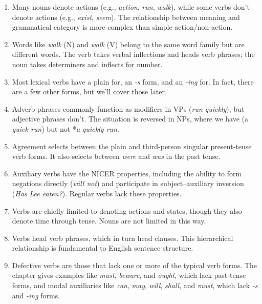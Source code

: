 \begin{tcolorbox}[title=Answer Key, colback=white, colframe=black, coltitle=black, fonttitle=\bfseries, colbacktitle=gray!10!white]

\begin{enumerate}[noitemsep]
    \item Many nouns denote actions (e.g., \textit{action}, \textit{run}, \textit{walk}), while some verbs don't denote actions (e.g., \textit{exist}, \textit{seem}). The relationship between meaning and grammatical category is more complex than simple action/non-action.
    
    \item Words like \textit{walk} (N) and \textit{walk} (V) belong to the same word family but are different words. The verb takes verbal inflections and heads verb phrases; the noun takes determiners and inflects for number.
    
    \item Most lexical verbs have a plain for, an \textit{-s} form, and an \textit{-ing} for. In fact, there are a few other forms, but we'll cover those later.
    
    \item Adverb phrases commonly function as modifiers in VPs (\textit{run quickly}), but adjective phrases don't. The situation is reversed in NPs, where we have (a \textit{quick run}) but not *\textit{a quickly run}.
    
    \item Agreement selects between the plain and third-person singular present-tense verb forms. It also selects between \textit{were} and \textit{was} in the past tense.
    
    \item Auxiliary verbs have the NICER properties, including the ability to form negations directly (\textit{will not}) and participate in subject--auxiliary inversion (\textit{Has Lee eaten?}). Regular verbs lack these properties.
    
    \item Verbs are chiefly limited to denoting actions and states, though they also denote time through tense. Nouns are not limited in this way.
    
    \item Verbs head verb phrases, which in turn head clauses. This hierarchical relationship is fundamental to English sentence structure.
    
    \item Defective verbs are those that lack one or more of the typical verb forms. The chapter gives examples like \textit{must}, \textit{beware}, and \textit{ought}, which lack past-tense forms, and modal auxiliaries like \textit{can}, \textit{may}, \textit{will}, \textit{shall}, and \textit{must}, which lack \textit{-s} and \textit{-ing} forms.
\end{enumerate}

\end{tcolorbox}

